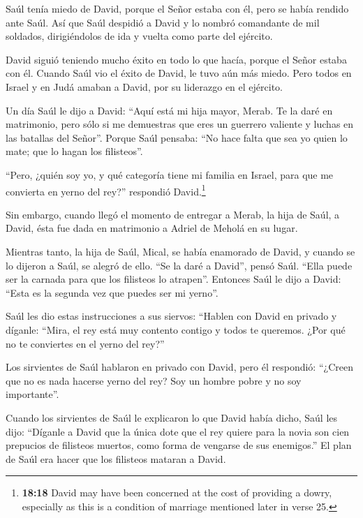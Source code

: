  Saúl tenía miedo de David, porque el Señor estaba con él,
pero se había rendido ante Saúl.  Así que Saúl despidió a
David y lo nombró comandante de mil soldados, dirigiéndolos de ida y
vuelta como parte del ejército.

 David siguió teniendo mucho éxito en todo lo que hacía,
porque el Señor estaba con él.  Cuando Saúl vio el éxito de
David, le tuvo aún más miedo.  Pero todos en Israel y en
Judá amaban a David, por su liderazgo en el ejército.

 Un día Saúl le dijo a David: ``Aquí está mi hija mayor,
Merab. Te la daré en matrimonio, pero sólo si me demuestras que eres un
guerrero valiente y luchas en las batallas del Señor''. Porque Saúl
pensaba: ``No hace falta que sea yo quien lo mate; que lo hagan los
filisteos''.

 ``Pero, ¿quién soy yo, y qué categoría tiene mi familia en
Israel, para que me convierta en yerno del rey?'' respondió
David.\footnote{\textbf{18:18} David may have been concerned at the cost
  of providing a dowry, especially as this is a condition of marriage
  mentioned later in verse 25.}

 Sin embargo, cuando llegó el momento de entregar a Merab,
la hija de Saúl, a David, ésta fue dada en matrimonio a Adriel de Meholá
en su lugar.

 Mientras tanto, la hija de Saúl, Mical, se había enamorado
de David, y cuando se lo dijeron a Saúl, se alegró de ello.
 ``Se la daré a David'', pensó Saúl. ``Ella puede ser la
carnada para que los filisteos lo atrapen''. Entonces Saúl le dijo a
David: ``Esta es la segunda vez que puedes ser mi yerno''.

 Saúl les dio estas instrucciones a sus siervos: ``Hablen
con David en privado y díganle: ``Mira, el rey está muy contento contigo
y todos te queremos. ¿Por qué no te conviertes en el yerno del rey?''

 Los sirvientes de Saúl hablaron en privado con David, pero
él respondió: ``¿Creen que no es nada hacerse yerno del rey? Soy un
hombre pobre y no soy importante''.

 Cuando los sirvientes de Saúl le explicaron lo que David
había dicho,  Saúl les dijo: ``Díganle a David que la única
dote que el rey quiere para la novia son cien prepucios de filisteos
muertos, como forma de vengarse de sus enemigos.'' El plan de Saúl era
hacer que los filisteos mataran a David.

